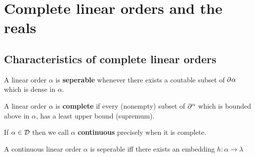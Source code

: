
\chapter{Complete linear orders and the reals}

	\section{Characteristics of complete linear orders}

	\begin{dfn}[Separable]
		A linear order $\alpha$ is \textbf{seperable} whenever there exists a coutable subset of $\partial^{}\alpha$ which is dense in $\alpha$.
	\end{dfn}

	\begin{dfn}[Completeness]
		A linear order $\alpha$ is \textbf{complete} if every (nonempty) subset of $\partial^{\alpha}$ which is bounded above in $\alpha$, has a least upper bound (supremum).
	\end{dfn}

	\begin{dfn}
		If $\alpha\in\mathcal{D}$ then we call $\alpha$ \textbf{continuous} precisely when it is complete.
	\end{dfn}

	\begin{prp}[Seperability]\label{prp:sep}
		A continuous linear order $\alpha$ is seperable iff there exists an embedding $h\colon\alpha\to\lambda$
	\end{prp}

